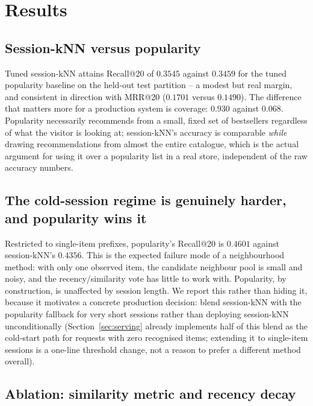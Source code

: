\section{Results}
\label{sec:results}



\subsection{Session-kNN versus popularity}

Tuned session-kNN attains Recall@20 of $0.3545$ against $0.3459$ for the
tuned popularity baseline on the held-out test partition -- a modest but
real margin, and consistent in direction with MRR@20 ($0.1701$ versus
$0.1490$). The difference that matters more for a production system is
coverage: $0.930$ against $0.068$. Popularity necessarily recommends from a
small, fixed set of bestsellers regardless of what the visitor is looking
at; session-kNN's accuracy is comparable \emph{while} drawing recommendations
from almost the entire catalogue, which is the actual argument for using it
over a popularity list in a real store, independent of the raw accuracy
numbers.

\subsection{The cold-session regime is genuinely harder, and popularity wins it}

Restricted to single-item prefixes, popularity's Recall@20 is $0.4601$
against session-kNN's $0.4356$. This is the expected failure mode of a
neighbourhood method: with only one observed item, the candidate neighbour
pool is small and noisy, and the recency/similarity vote has little to work
with. Popularity, by construction, is unaffected by session length. We report
this rather than hiding it, because it motivates a concrete production
decision: blend session-kNN with the popularity fallback for very short
sessions rather than deploying session-kNN unconditionally
(Section~\ref{sec:serving} already implements half of this blend as the
cold-start path for requests with zero recognised items; extending it to
single-item sessions is a one-line threshold change, not a reason to prefer a
different method overall).

\subsection{Ablation: similarity metric and recency decay}

